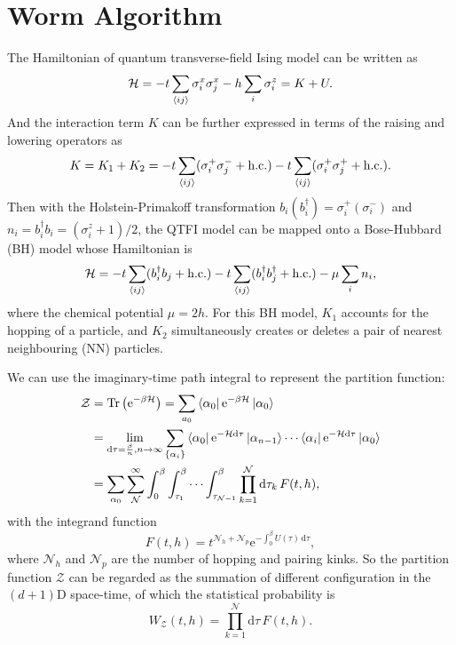 \documentclass{article}
\DeclareMathOperator{\Tr}{Tr}
\theoremstyle{plain} \newtheorem{thm}{Theorem}[section]
\theoremstyle{definition} \newtheorem{df}{Definition}[section]
\theoremstyle{definition} \newtheorem{eg}{Example}
\theoremstyle{remark} \newtheorem*{rmk}{Remark}
\begin{document}
\section{Worm Algorithm}
The Hamiltonian of quantum transverse-field Ising model can be written as
\begin{equation}
  \mathcal{H} = -t\sum_{\braket{ij}}\sigma_i^x\sigma_j^x - h\sum_{i}\sigma_i^z = K+U.
\end{equation}
And the interaction term $K$ can be further expressed in terms of the raising and lowering operators as
\begin{equation}
  K = K_1+K_2 = -t\sum_{\braket{ij}}(\sigma_i^+\sigma_j^-+\text{h.c.})-t\sum_{\braket{ij}}(\sigma_i^+\sigma_j^++\text{h.c.}).
\end{equation}
Then with the Holstein-Primakoff transformation $b_i(b_i^\dag) = \sigma_i^+(\sigma_i^-)$ and $n_i = b_i^\dag b_i = (\sigma_i^z+1)/2$, the QTFI model can be mapped onto a Bose-Hubbard (BH) model whose Hamiltonian is
\begin{equation}
  \mathcal{H} = -t\sum_{\braket{ij}}(b_i^\dag b_j+\text{h.c.})-t\sum_{\braket{ij}}(b_i^\dag b_j^\dag+\text{h.c.})-\mu\sum_{i}n_i, 
\end{equation}
where the chemical potential $\mu = 2h$. For this BH model, $K_1$ accounts for the hopping of a particle, and $K_2$ simultaneously creates or deletes a pair of nearest neighbouring (NN) particles.

We can use the imaginary-time path integral to represent the partition function: 
\begin{align}
  \mathcal{Z} &= \Tr \left(\mathrm{e}^{-\beta \mathcal{H}}\right) = \sum_{a_0}\bra{\alpha_0}\mathrm{e}^{-\beta \mathcal{H}}\ket{\alpha_0}\\
              &= \lim_{\mathrm{d}\tau = \frac{\beta}{n}, n \to \infty} \sum_{\{\alpha_i\}}\bra{\alpha_0}\mathrm{e}^{-\mathcal{H}\mathrm{d}\tau}\ket{\alpha_{n-1}}\cdots \bra{\alpha_i}\mathrm{e}^{-\mathcal{H}\mathrm{d}\tau}\ket{\alpha_0}\\
              &= \sum_{\alpha_0}\sum_{\mathcal{N}}^{\infty}\int_{0}^{\beta}\int_{\tau_1}^{\beta}\cdots \int_{\tau_{\mathcal{N}-1}}^{\beta} \prod_{k=1}^{\mathcal{N}}\mathrm{d}\tau_k\,F(t, h),
\end{align}
with the integrand function
\begin{equation}
  F(t, h) = t^{\mathcal{N}_h+\mathcal{N}_p}\mathrm{e}^{-\int_{0}^{\beta}U(\tau)\,\mathrm{d}\tau},
  \label{eq:integrand}
\end{equation}
where $\mathcal{N}_h$ and $\mathcal{N}_p$ are the number of hopping and pairing kinks. So the partition function $\mathcal{Z}$ can be regarded as the summation of different configuration in the $(d+1)$D space-time, of which the statistical probability is
\begin{equation}
  W_{\mathcal{Z}}(t, h) = \prod_{k=1}^{\mathcal{N}}\mathrm{d}\tau\,F(t, h).
\end{equation}
\end{document}
